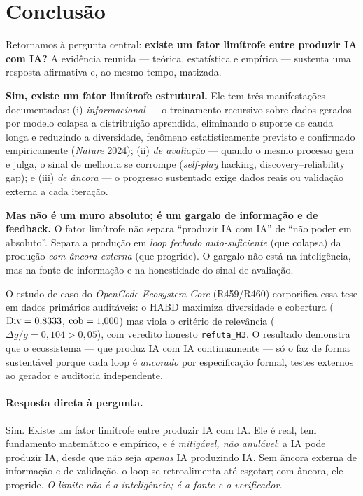 \section{Conclusão}\label{sec:conc}

Retornamos à pergunta central: \textbf{existe um fator limítrofe entre produzir
IA com IA?} A evidência reunida --- teórica, estatística e empírica --- sustenta
uma resposta afirmativa e, ao mesmo tempo, matizada.

\textbf{Sim, existe um fator limítrofe estrutural.} Ele tem três manifestações
documentadas: (i) \emph{informacional} --- o treinamento recursivo sobre dados
gerados por modelo colapsa a distribuição aprendida, eliminando o suporte de
cauda longa e reduzindo a diversidade, fenômeno estatisticamente previsto e
confirmado empiricamente (\emph{Nature} 2024); (ii) \emph{de avaliação} --- quando
o mesmo processo gera e julga, o sinal de melhoria se corrompe
(\emph{self-play} hacking, discovery--reliability gap); e (iii) \emph{de âncora} ---
o progresso sustentado exige dados reais ou validação externa a cada iteração.

\textbf{Mas não é um muro absoluto; é um gargalo de informação e de feedback.} O
fator limítrofe não separa ``produzir IA com IA'' de ``não poder em absoluto''.
Separa a produção em \emph{loop fechado auto-suficiente} (que colapsa) da
produção \emph{com âncora externa} (que progride). O gargalo não está na
inteligência, mas na fonte de informação e na honestidade do sinal de avaliação.

O estudo de caso do \emph{OpenCode Ecosystem Core} (R459/R460) corporifica essa
tese em dados primários auditáveis: o HABD maximiza diversidade e cobertura
($\mathrm{Div} = 0{,}8333$, $\mathrm{cob} = 1{,}000$) mas viola o critério de relevância
($\Delta g/g = 0{,}104 > 0{,}05$), com veredito honesto \texttt{refuta\_H3}. O
resultado demonstra que o ecossistema --- que produz IA com IA continuamente ---
só o faz de forma sustentável porque cada loop é \emph{ancorado} por
especificação formal, testes externos ao gerador e auditoria independente.

\paragraph{Resposta direta à pergunta.}
Sim. Existe um fator limítrofe entre produzir IA com IA. Ele é real, tem
fundamento matemático e empírico, e é \emph{mitigável, não anulável}: a IA pode
produzir IA, desde que não seja \emph{apenas} IA produzindo IA. Sem âncora
externa de informação e de validação, o loop se retroalimenta até esgotar; com
âncora, ele progride. \emph{O limite não é a inteligência; é a fonte e o
verificador.}

